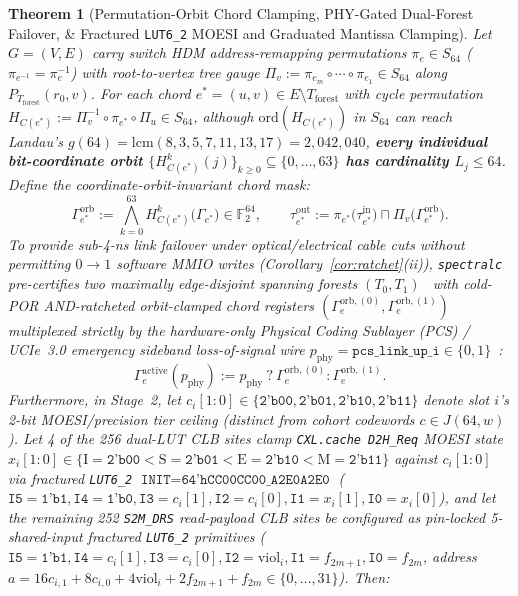 \documentclass[10pt,twocolumn]{article}
\theoremstyle{spectralthm}
\newtheorem{theorem}{Theorem}[section]
\begin{document}
\begin{theorem}[Permutation-Orbit Chord Clamping, PHY-Gated Dual-Forest Failover, \& Fractured \texttt{LUT6\_2} MOESI and Graduated Mantissa Clamping]
\label{thm:sheaf_moesi}
Let $G = (V, E)$ carry switch HDM address-remapping permutations $\pi_e \in S_{64}$ ($\pi_{e^{-1}} = \pi_e^{-1}$) with root-to-vertex tree gauge $\Pi_v := \pi_{e_m} \circ \cdots \circ \pi_{e_1} \in S_{64}$ along $P_{T_{\mathrm{forest}}}(r_0, v)$. For each chord $e^* = (u,v) \in E \setminus T_{\mathrm{forest}}$ with cycle permutation $H_{C(e^*)} := \Pi_v^{-1} \circ \pi_{e^*} \circ \Pi_u \in S_{64}$, although $\mathrm{ord}(H_{C(e^*)})$ in $S_{64}$ can reach Landau's $g(64) = \mathrm{lcm}(8,3,5,7,11,13,17) = 2,042,040$, \textbf{every individual bit-coordinate orbit $\{H_{C(e^*)}^k(j)\}_{k \ge 0} \subseteq \{0,\ldots,63\}$ has cardinality $L_j \le 64$}. Define the coordinate-orbit-invariant chord mask:
\begin{equation}
\label{eq:holonomy_orbit}
\Gamma_{e^*}^{\mathrm{orb}} := \bigwedge_{k=0}^{63} H_{C(e^*)}^k\bigl(\Gamma_{e^*}\bigr) \in \mathbb{F}_2^{64},\qquad
\tau_{e^*}^{\mathrm{out}} := \pi_{e^*}\bigl(\tau_{e^*}^{\mathrm{in}}\bigr) \sqcap \Pi_v\bigl(\Gamma_{e^*}^{\mathrm{orb}}\bigr).
\end{equation}
To provide sub-4-ns link failover under optical/electrical cable cuts without permitting $0 \rightarrow 1$ software MMIO writes (Corollary~\ref{cor:ratchet}(ii)), \texttt{spectralc} pre-certifies two maximally edge-disjoint spanning forests $(T_0, T_1)$~\cite{tutte1961problem,nashwilliams1961edge} with cold-POR AND-ratcheted orbit-clamped chord registers $(\Gamma_e^{\mathrm{orb},(0)}, \Gamma_e^{\mathrm{orb},(1)})$ multiplexed strictly by the hardware-only Physical Coding Sublayer (PCS) / UCIe~3.0 emergency sideband loss-of-signal wire $p_{\mathrm{phy}} = \texttt{pcs\_link\_up\_i} \in \{0,1\}$~\cite{ucie2025spec30}:
\begin{equation}
\label{eq:phy_failover}
\Gamma_e^{\mathrm{active}}(p_{\mathrm{phy}}) := p_{\mathrm{phy}}\ ?\ \Gamma_e^{\mathrm{orb},(0)} : \Gamma_e^{\mathrm{orb},(1)}.
\end{equation}
Furthermore, in Stage~2, let $c_i[1:0] \in \{\texttt{2'b00},\texttt{2'b01},\texttt{2'b10},\texttt{2'b11}\}$ denote slot $i$'s 2-bit MOESI/precision tier ceiling (distinct from cohort codewords $c \in J(64,w)$). Let 4 of the 256 dual-LUT CLB sites clamp \texttt{CXL.cache D2H\_Req} MOESI state $x_i[1:0] \in \{\mathrm{I}=\texttt{2'b00} < \mathrm{S}=\texttt{2'b01} < \mathrm{E}=\texttt{2'b10} < \mathrm{M}=\texttt{2'b11}\}$ against $c_i[1:0]$ via fractured \mbox{\texttt{LUT6\_2}} $\texttt{INIT} = \texttt{64'hCC00CC00\_A2E0A2E0}$ ($\texttt{I5}=\texttt{1'b1},\allowbreak \texttt{I4}=\texttt{1'b0},\allowbreak \texttt{I3}=c_i[1],\allowbreak \texttt{I2}=c_i[0],\allowbreak \texttt{I1}=x_i[1],\allowbreak \texttt{I0}=x_i[0]$), and let the remaining 252 \texttt{S2M\_DRS} read-payload CLB sites be configured as pin-locked 5-shared-input fractured \mbox{\texttt{LUT6\_2}} primitives ($\texttt{I5}=\texttt{1'b1},\allowbreak \texttt{I4}=c_i[1],\allowbreak \texttt{I3}=c_i[0],\allowbreak \texttt{I2}=\mathrm{viol}_i,\allowbreak \texttt{I1}=f_{2m+1},\allowbreak \texttt{I0}=f_{2m}$, address $a = 16c_{i,1} + 8c_{i,0} + 4\mathrm{viol}_i + 2f_{2m+1} + f_{2m} \in \{0,\ldots,31\}$). Then:

\end{theorem}
\end{document}
